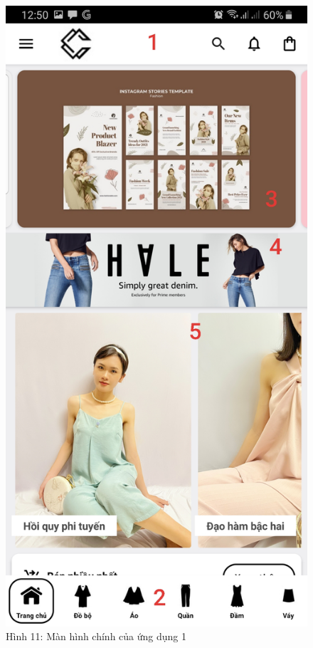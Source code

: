 \documentclass{beamer}
\begin{document}
\begin{frame}
    \begin{columns}
        \begin{figure}
            \centering
            \includegraphics[height=0.7\textheight]{images/06.png}
            \caption{\centering\tiny{Hình 11: Màn hình chính của ứng dụng 1}}


\end{figure}
\end{columns}
\end{frame}
\end{document}
